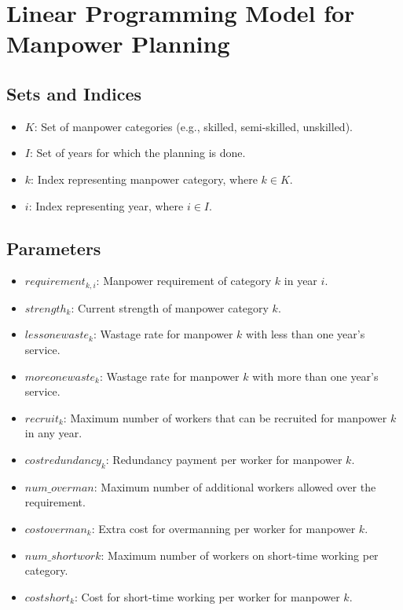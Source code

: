 \documentclass{article}
\begin{document}
\section*{Linear Programming Model for Manpower Planning}

\subsection*{Sets and Indices}
\begin{itemize}
    \item $K$: Set of manpower categories (e.g., skilled, semi-skilled, unskilled).
    \item $I$: Set of years for which the planning is done.
    \item $k$: Index representing manpower category, where $k \in K$.
    \item $i$: Index representing year, where $i \in I$.
\end{itemize}

\subsection*{Parameters}
\begin{itemize}
    \item $requirement_{k, i}$: Manpower requirement of category $k$ in year $i$.
    \item $strength_{k}$: Current strength of manpower category $k$.
    \item $lessonewaste_{k}$: Wastage rate for manpower $k$ with less than one year's service.
    \item $moreonewaste_{k}$: Wastage rate for manpower $k$ with more than one year's service.
    \item $recruit_{k}$: Maximum number of workers that can be recruited for manpower $k$ in any year.
    \item $costredundancy_{k}$: Redundancy payment per worker for manpower $k$.
    \item $num\_overman$: Maximum number of additional workers allowed over the requirement.
    \item $costoverman_{k}$: Extra cost for overmanning per worker for manpower $k$.
    \item $num\_shortwork$: Maximum number of workers on short-time working per category.
    \item $costshort_{k}$: Cost for short-time working per worker for manpower $k$.
\end{itemize}
\end{document}
